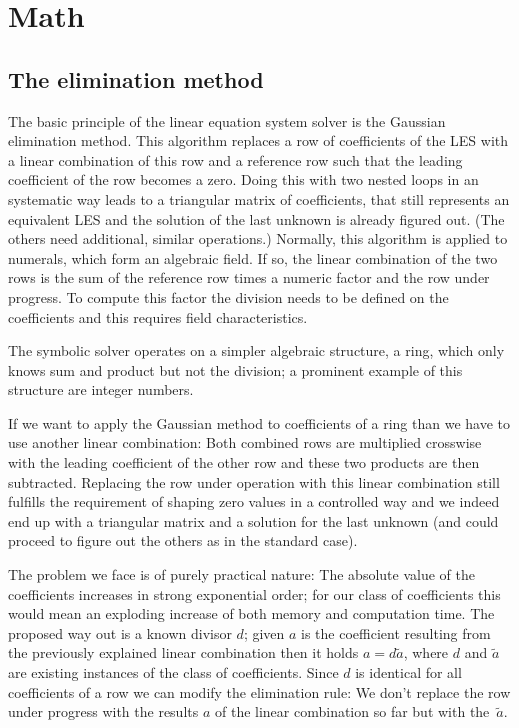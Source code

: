 \chapter{Math}

\section{The elimination method}
\label{secEliminationMethod}

The basic principle of the linear equation system solver is the Gaussian
elimination method. This algorithm replaces a row of coefficients of the
LES with a linear combination of this row and a reference row such that
the leading coefficient of the row becomes a zero. Doing this with two
nested loops in an systematic way leads to a triangular matrix of
coefficients, that still represents an equivalent LES and the solution of
the last unknown is already figured out. (The others need additional,
similar operations.) Normally, this algorithm is applied to numerals,
which form an algebraic field. If so, the linear combination of the two
rows is the sum of the reference row times a numeric factor and the row
under progress. To compute this factor the division needs to be defined on
the coefficients and this requires field characteristics.

The symbolic solver operates on a simpler algebraic structure, a ring,
which only knows sum and product but not the division; a prominent example
of this structure are integer numbers.

If we want to apply the Gaussian method to coefficients of a ring than we
have to use another linear combination: Both combined rows are multiplied
crosswise with the leading coefficient of the other row and these two
products are then subtracted. Replacing the row under operation with this
linear combination still fulfills the requirement of shaping zero values
in a controlled way and we indeed end up with a triangular matrix and a
solution for the last unknown (and could proceed to figure out the others
as in the standard case).

The problem we face is of purely practical nature: The absolute value of
the coefficients increases in strong exponential order; for our class of
coefficients this would mean an exploding increase of both memory and
computation time. The proposed way out is a known divisor $d$; given $a$
is the coefficient resulting from the previously explained linear
combination then it holds $a = d \tilde a$, where $d$ and $\tilde a$ are
existing instances of the class of coefficients. Since $d$ is identical
for all coefficients of a row we can modify the elimination rule: We
don't replace the row under progress with the results $a$ of the linear
combination so far but with the~$\tilde a$.

